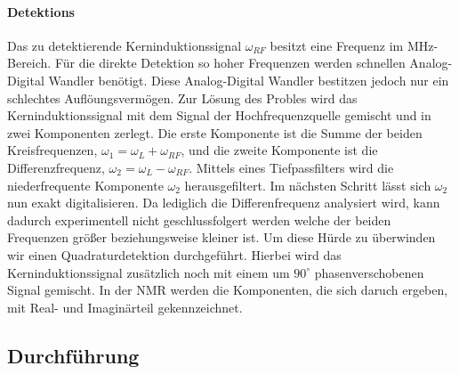 \paragraph{Detektions}
Das zu detektierende Kerninduktionssignal $\omega_{RF}$ besitzt eine Frequenz im MHz-Bereich.
F\"{u}r die direkte Detektion so hoher Frequenzen werden schnellen Analog-Digital Wandler ben\"{o}tigt.
Diese Analog-Digital Wandler bestitzen jedoch nur ein schlechtes Aufl\"{o}ungsverm\"{o}gen.
Zur L\"{o}sung des Probles wird das Kerninduktionssignal mit dem Signal der Hochfrequenzquelle gemischt und in zwei Komponenten zerlegt.
Die erste Komponente ist die Summe der beiden Kreisfrequenzen, $\omega_1 = \omega_L + \omega_{RF}$, und die zweite Komponente ist die Differenzfrequenz, $\omega_2 = \omega_L - \omega_{RF}$.
Mittels eines Tiefpassfilters wird die niederfrequente Komponente $\omega_2$ herausgefiltert.
Im n\"{a}chsten Schritt l\"{a}sst sich $\omega_2$ nun exakt digitalisieren.
Da lediglich die Differenfrequenz analysiert wird, kann dadurch experimentell nicht geschlussfolgert werden welche der beiden Frequenzen gr\"{o}{\ss}er beziehungsweise kleiner ist.
Um diese H\"{u}rde zu \"{u}berwinden wir einen Quadraturdetektion durchgef\"{u}hrt.
Hierbei wird das Kerninduktionssignal zus\"{a}tzlich noch mit einem um $90^{\circ}$ phasenverschobenen Signal gemischt.
In der NMR werden die Komponenten, die sich daruch ergeben, mit Real- und Imagin\"{a}rteil gekennzeichnet.



\subsection{Durchf\"{u}hrung}
